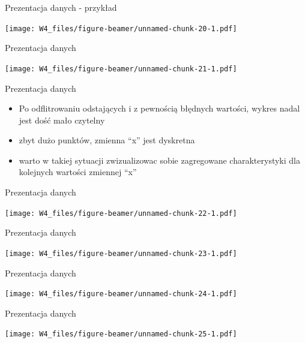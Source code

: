 \documentclass[ignorenonframetext,]{beamer}
\providecommand{\tightlist}{%
\setlength{\itemsep}{0pt}\setlength{\parskip}{0pt}}
\begin{document}
\begin{frame}{Prezentacja danych - przykład}

\texttt{[image: W4\_files/figure-beamer/unnamed-chunk-20-1.pdf]}

\end{frame}

\begin{frame}{Prezentacja danych}

\texttt{[image: W4\_files/figure-beamer/unnamed-chunk-21-1.pdf]}

\end{frame}

\begin{frame}{Prezentacja danych}

\begin{itemize}
\tightlist
\item
  Po odflitrowaniu odstających i z pewnością błędnych wartości, wykres
  nadal jest dość mało czytelny
\item
  zbyt dużo punktów, zmienna ``x'' jest dyskretna
\item
  warto w takiej sytuacji zwizualizowac sobie zagregowane
  charakterystyki dla kolejnych wartości zmiennej ``x''
\end{itemize}

\end{frame}

\begin{frame}{Prezentacja danych}

\texttt{[image: W4\_files/figure-beamer/unnamed-chunk-22-1.pdf]}

\end{frame}

\begin{frame}{Prezentacja danych}

\texttt{[image: W4\_files/figure-beamer/unnamed-chunk-23-1.pdf]}

\end{frame}

\begin{frame}{Prezentacja danych}

\texttt{[image: W4\_files/figure-beamer/unnamed-chunk-24-1.pdf]}

\end{frame}

\begin{frame}{Prezentacja danych}

\texttt{[image: W4\_files/figure-beamer/unnamed-chunk-25-1.pdf]}

\end{frame}
\end{document}
